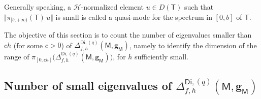\documentclass[JEP,XML,SOM,Unicode,NoEqCountersInSection,NoFloatCountersInSection,published]{cedram}
\newcommand{\mbf}[1]{\mathbf{#1}}
\theoremstyle{plain}
\theoremstyle{definition}
\begin{document}
Generally speaking, a $\mathcal H$-normalized element $u\in D\left (\mathsf T\right)$
such that $\Vert \pi_{[b,+\infty)} (\mathsf T) \, u \Vert$ is small is
called a quasi-mode for the spectrum in $[0,b]$ of $\mathsf T$.

The objective of this section is to count
the number of eigenvalues smaller than $ch$ (for some $c>0$) of
$\Delta_{f,h}^{\mathsf{Di},(q)}(\mathsf M,\mbf g_{\mathsf M})$,
namely to identify the dimension of the range of $\pi_{[0,\mathsf
ch]}\bigl(\Delta_{f,h}^{\mathsf{Di},(q)}(\mathsf M,\mbf g_{\mathsf
M}) \bigr)$, for $h$ sufficiently small.

\subsection{Number of small eigenvalues of
$\Delta_{f,h}^{\mathsf{Di},(q)}(\mathsf M,\mbf g_{\mathsf M})$}
\label{sec.mainresult_petitevp}
\end{document}
